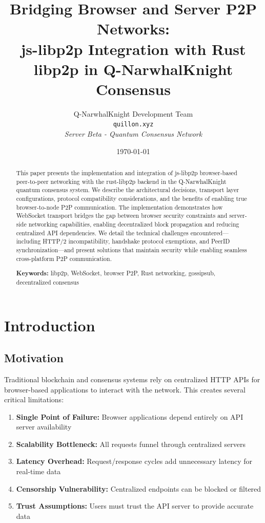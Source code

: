 \documentclass[11pt,a4paper]{article}
\title{\textbf{Bridging Browser and Server P2P Networks:}\\
\large{js-libp2p Integration with Rust libp2p in Q-NarwhalKnight Consensus}}
\author{
Q-NarwhalKnight Development Team\\
\texttt{quillon.xyz}\\[0.5em]
\textit{Server Beta - Quantum Consensus Network}
}
\date{\today}
\begin{document}
\maketitle

\begin{abstract}
This paper presents the implementation and integration of js-libp2p browser-based peer-to-peer networking with the rust-libp2p backend in the Q-NarwhalKnight quantum consensus system. We describe the architectural decisions, transport layer configurations, protocol compatibility considerations, and the benefits of enabling true browser-to-node P2P communication. The implementation demonstrates how WebSocket transport bridges the gap between browser security constraints and server-side networking capabilities, enabling decentralized block propagation and reducing centralized API dependencies. We detail the technical challenges encountered---including HTTP/2 incompatibility, handshake protocol exemptions, and PeerID synchronization---and present solutions that maintain security while enabling seamless cross-platform P2P communication.

\textbf{Keywords:} libp2p, WebSocket, browser P2P, Rust networking, gossipsub, decentralized consensus
\end{abstract}

\tableofcontents
\newpage

\section{Introduction}

\subsection{Motivation}

Traditional blockchain and consensus systems rely on centralized HTTP APIs for browser-based applications to interact with the network. This creates several critical limitations:

\begin{enumerate}
    \item \textbf{Single Point of Failure:} Browser applications depend entirely on API server availability
    \item \textbf{Scalability Bottleneck:} All requests funnel through centralized servers
    \item \textbf{Latency Overhead:} Request/response cycles add unnecessary latency for real-time data
    \item \textbf{Censorship Vulnerability:} Centralized endpoints can be blocked or filtered
    \item \textbf{Trust Assumptions:} Users must trust the API server to provide accurate data
\end{enumerate}
\end{document}

